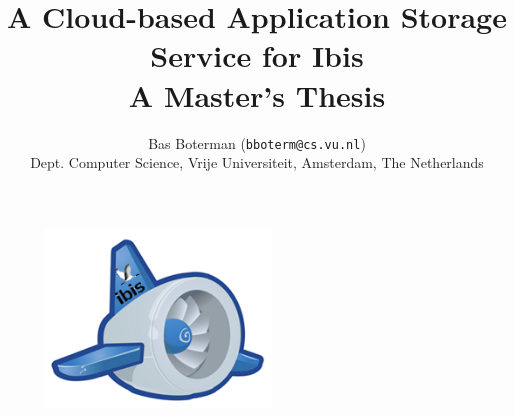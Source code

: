 \documentclass[a4paper,11pt]{article}
\title{
  \textbf{A Cloud-based Application Storage Service for Ibis}\\
  \Large A Master's Thesis
}
\author{
  Bas Boterman (\texttt{bboterm@cs.vu.nl})\\
  \small Dept. Computer Science, Vrije Universiteit, Amsterdam, The Netherlands
}
\begin{document}
\maketitle

\begin{figure}[h]
\begin{center}
\includegraphics[width=6cm]{msc_logo.png} 
\end{center}
\end{figure}


\newpage

\tableofcontents
\newpage


\newpage


\newpage


\newpage


\newpage

 
\newpage


\newpage


\newpage


\newpage

\appendix


\newpage


\newpage


\newpage


\newpage



\end{document}
